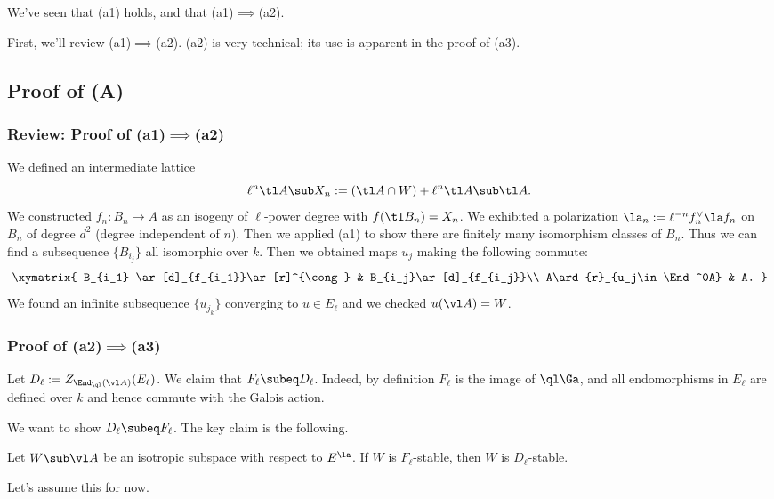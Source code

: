 We've seen that (a1) holds, and that (a1)$\implies$(a2). %


First, we'll review (a1)$\implies$(a2). (a2) is very technical; its use is apparent in the proof of (a3).

\subsection{Proof of (A)}
\subsubsection{Review: Proof of (a1)$\implies$(a2)}

We defined an intermediate lattice 
\[\ell^n\tl A\sub X_n:=(\tl A\cap W)+\ell^n \tl A\sub \tl A.\]
We constructed $f_n:B_n\to A$ as an isogeny of $\ell$-power degree with $f(\tl B_n)=X_n$. %
We exhibited a polarization $\la_n:=\ell^{-n}f_n^{\vee} \la f_n$ on $B_n$ of degree $d^2$ (degree independent of $n$). Then we applied (a1) to show there are finitely many isomorphism classes of $B_n$. Thus we can find a subsequence $\{B_{i_j}\}$ all isomorphic over $k$. Then we obtained maps $u_j$ making the following commute:
\[
\xymatrix{
B_{i_1} \ar[d]_{f_{i_1}}\ar[r]^{\cong} & B_{i_j}\ar[d]_{f_{i_j}}\\
A\ard{r}_{u_j\in \End^0A} & A.
}
\]
We found an infinite subsequence $\{u_{j_k}\}$ converging to $u\in E_{\ell}$ %
and we checked $u(\vl A)=W$. %

\subsubsection{Proof of (a2)$\implies$(a3)}
Let $D_{\ell}:=Z_{\End_{\ql}(\vl A)}(E_{\ell})$. %
We claim that $F_{\ell}\subeq D_{\ell}$. Indeed, by definition $F_{\ell}$ is the image of $\ql \Ga$, and all endomorphisms in $E_{\ell}$ are defined over $k$ and hence commute with the Galois action.

We want to show $D_{\ell}\subeq F_{\ell}$.
The key claim is the following. 
\begin{clm}
Let $W\sub \vl A$ be an isotropic subspace with respect to $E^{\la}$. If $W$ is $F_{\ell}$-stable, then $W$ is $D_{\ell}$-stable.
\end{clm}
Let's assume this for now.

